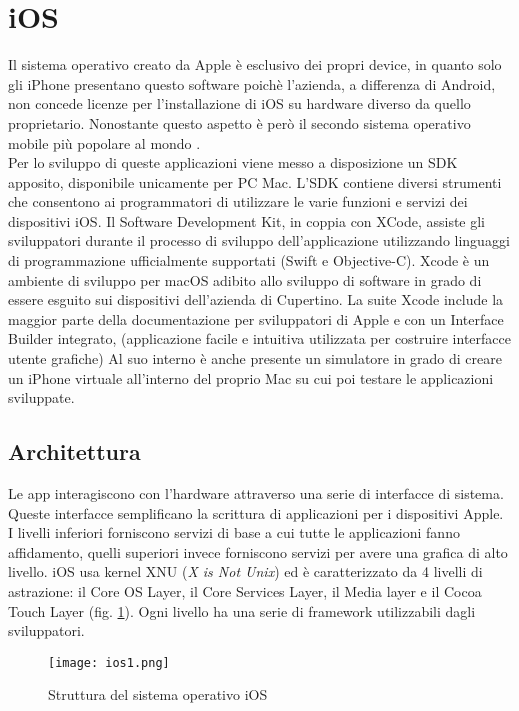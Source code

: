 \section{iOS}
Il sistema operativo creato da Apple è esclusivo dei propri device, in quanto
solo gli iPhone presentano questo software poichè l'azienda, a differenza di
Android, non concede licenze per l’installazione di iOS su hardware diverso da quello
proprietario. Nonostante questo aspetto è però il secondo
sistema operativo mobile più popolare al mondo \cite{rep}. \\
Per lo sviluppo di queste applicazioni viene messo a disposizione un SDK apposito,
disponibile unicamente per PC Mac. L’SDK contiene diversi strumenti che
consentono ai programmatori di utilizzare le varie funzioni e servizi dei
dispositivi iOS. Il Software Development Kit, in coppia con XCode, assiste gli
sviluppatori durante il processo di sviluppo dell'applicazione utilizzando
linguaggi di programmazione ufficialmente
supportati (Swift
e Objective-C). Xcode è un ambiente di sviluppo per macOS adibito allo sviluppo
di software in grado di essere esguito sui dispositivi dell'azienda di
Cupertino. La suite Xcode include la maggior parte
della documentazione per sviluppatori di Apple e con un Interface Builder integrato,
(applicazione facile e intuitiva utilizzata per costruire interfacce utente
grafiche) Al suo interno è anche presente un simulatore in grado di creare un
iPhone virtuale all'interno del proprio Mac su cui poi testare le applicazioni
sviluppate.
\subsection{Architettura}
Le app interagiscono con l’hardware attraverso una serie di interfacce di
sistema. Queste interfacce semplificano la scrittura di applicazioni per i
dispositivi Apple. I livelli inferiori forniscono servizi di base a cui tutte le
applicazioni fanno affidamento, quelli superiori invece forniscono servizi
per avere una grafica di alto livello. iOS usa kernel XNU (\textit{X is Not
Unix}) ed è caratterizzato da
4 livelli di astrazione: il Core OS Layer, il Core Services Layer, il Media layer e
il Cocoa Touch Layer (fig. \ref{ios1}). Ogni livello ha una serie di framework
utilizzabili dagli sviluppatori. 
\begin{figure}[!h]
    \centering
    \texttt{[image: ios1.png]}
    \caption{Struttura del sistema operativo iOS \cite{huhuh}}
    \label{ios1}
\end{figure}

